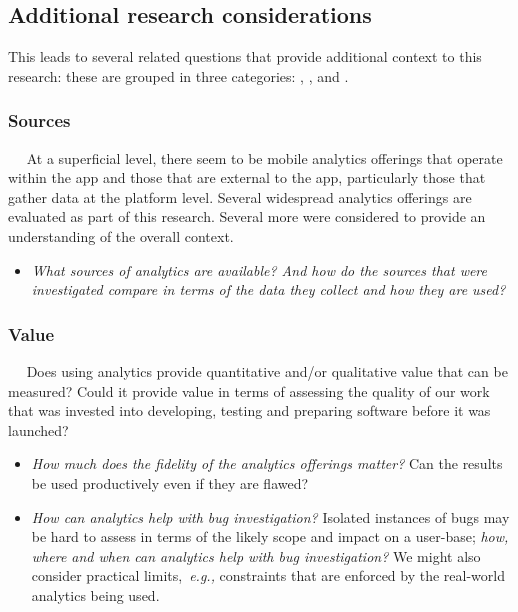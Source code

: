 \subsection{Additional research considerations}

This leads to several related questions that provide additional context to this research: these are grouped in three categories: \href{sec:sources}{\textbf{}}, \href{sec:value}{\textbf{}}, and \href{sec:impact}{\textbf{}}.

\subsubsection{Sources}~\label{section-sources}~\label{sec:sources}
At a superficial level, there seem to be mobile analytics offerings that operate within the app and those that are external to the app, particularly those that gather data at the platform level. Several widespread analytics offerings are evaluated as part of this research. Several more were considered to provide an understanding of the overall context.
\begin{itemize}
    \item \emph{What sources of analytics are available? And how do the sources that were investigated compare in terms of the data they collect and how they are used?}
\end{itemize}

\subsubsection{Value}~\label{section-value}~\label{sec:value}
Does using analytics provide quantitative and/or qualitative value that can be measured? Could it provide value in terms of assessing the quality of our work that was invested into developing, testing and preparing software before it was launched?
\begin{itemize}
    \item \emph{How much does the fidelity of the analytics offerings matter?} Can the results be used productively even if they are flawed? %

    \item \emph{How can analytics help with bug investigation?} Isolated instances of bugs may be hard to assess in terms of the likely scope and impact on a user-base; \emph{how, where and when can analytics help with bug investigation?} We might also consider practical limits,~\emph{e.g.,} constraints that are enforced by the real-world analytics being used.
\end{itemize}

